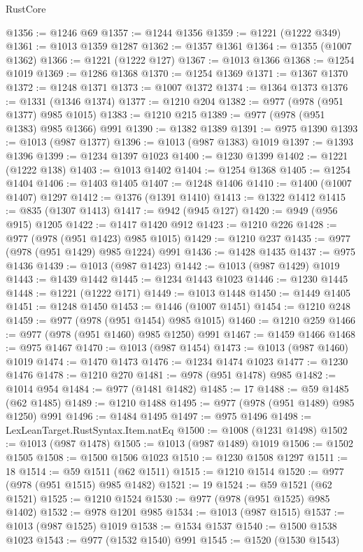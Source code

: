 \begin{lexlean}{RustCore}
\begin{coremodule}
@1356 := @1246 @69
@1357 := @1244 @1356
@1359 := @1221 (@1222 @349)
@1361 := @1013 @1359 @1287
@1362 := @1357 @1361
@1364 := @1355 (@1007 @1362)
@1366 := @1221 (@1222 @127)
@1367 := @1013 @1366
@1368 := @1254 @1019
@1369 := @1286 @1368
@1370 := @1254 @1369
@1371 := @1367 @1370
@1372 := @1248 @1371
@1373 := @1007 @1372
@1374 := @1364 @1373
@1376 := @1331 (@1346 @1374)
@1377 := @1210 @204
@1382 := @977 (@978 (@951 @1377) @985 @1015)
@1383 := @1210 @215
@1389 := @977 (@978 (@951 @1383) @985 @1366) @991
@1390 := @1382 @1389
@1391 := @975 @1390
@1393 := @1013 (@987 @1377)
@1396 := @1013 (@987 @1383) @1019
@1397 := @1393 @1396
@1399 := @1234 @1397 @1023
@1400 := @1230 @1399
@1402 := @1221 (@1222 @138)
@1403 := @1013 @1402
@1404 := @1254 @1368
@1405 := @1254 @1404
@1406 := @1403 @1405
@1407 := @1248 @1406
@1410 := @1400 (@1007 @1407) @1297
@1412 := @1376 (@1391 @1410)
@1413 := @1322 @1412
@1415 := @835 (@1307 @1413)
@1417 := @942 (@945 @127)
@1420 := @949 (@956 @915) @1205
@1422 := @1417 @1420 @912
@1423 := @1210 @226
@1428 := @977 (@978 (@951 @1423) @985 @1015)
@1429 := @1210 @237
@1435 := @977 (@978 (@951 @1429) @985 @1224) @991
@1436 := @1428 @1435
@1437 := @975 @1436
@1439 := @1013 (@987 @1423)
@1442 := @1013 (@987 @1429) @1019
@1443 := @1439 @1442
@1445 := @1234 @1443 @1023
@1446 := @1230 @1445
@1448 := @1221 (@1222 @171)
@1449 := @1013 @1448
@1450 := @1449 @1405
@1451 := @1248 @1450
@1453 := @1446 (@1007 @1451)
@1454 := @1210 @248
@1459 := @977 (@978 (@951 @1454) @985 @1015)
@1460 := @1210 @259
@1466 := @977 (@978 (@951 @1460) @985 @1250) @991
@1467 := @1459 @1466
@1468 := @975 @1467
@1470 := @1013 (@987 @1454)
@1473 := @1013 (@987 @1460) @1019
@1474 := @1470 @1473
@1476 := @1234 @1474 @1023
@1477 := @1230 @1476
@1478 := @1210 @270
@1481 := @978 (@951 @1478) @985
@1482 := @1014 @954
@1484 := @977 (@1481 @1482)
@1485 := 17
@1488 := @59 @1485 (@62 @1485)
@1489 := @1210 @1488
@1495 := @977 (@978 (@951 @1489) @985 @1250) @991
@1496 := @1484 @1495
@1497 := @975 @1496
@1498 := LexLeanTarget.RustSyntax.Item.natEq
@1500 := @1008 (@1231 @1498)
@1502 := @1013 (@987 @1478)
@1505 := @1013 (@987 @1489) @1019
@1506 := @1502 @1505
@1508 := @1500 @1506 @1023
@1510 := @1230 @1508 @1297
@1511 := 18
@1514 := @59 @1511 (@62 @1511)
@1515 := @1210 @1514
@1520 := @977 (@978 (@951 @1515) @985 @1482)
@1521 := 19
@1524 := @59 @1521 (@62 @1521)
@1525 := @1210 @1524
@1530 := @977 (@978 (@951 @1525) @985 @1402)
@1532 := @978 @1201 @985
@1534 := @1013 (@987 @1515)
@1537 := @1013 (@987 @1525) @1019
@1538 := @1534 @1537
@1540 := @1500 @1538 @1023
@1543 := @977 (@1532 @1540) @991
@1545 := @1520 (@1530 @1543)

\end{coremodule}
\end{lexlean}

